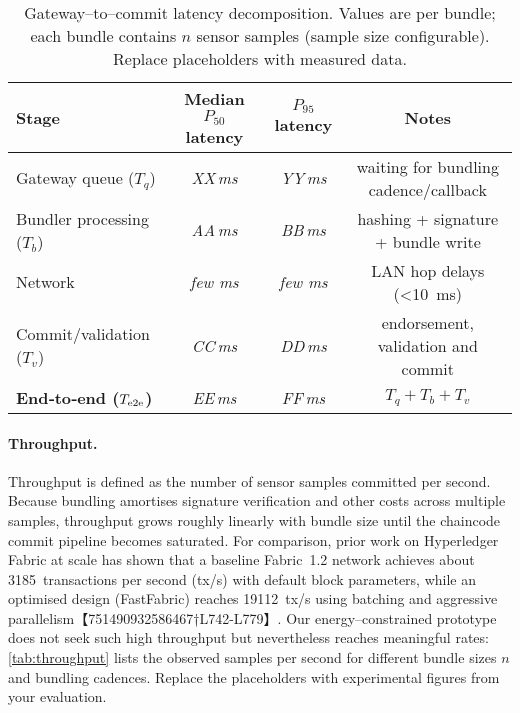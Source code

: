 \documentclass[12pt,onecolumn]{IEEEtran} %
\begin{document}
\begin{table}[h]
  \centering
  \caption{Gateway–to–commit latency decomposition.  Values are per bundle; each
  bundle contains $n$ sensor samples (sample size configurable).  Replace
  placeholders with measured data.}
  \label{tab:latency-metrics}
  \begin{tabular}{lccc}
    \toprule
    Stage & Median $P_{50}$ latency & $P_{95}$ latency & Notes \\
    \midrule
    Gateway queue ($T_q$) & \textit{XX\,ms} & \textit{YY\,ms} & waiting for
    bundling cadence/callback \\
    Bundler processing ($T_b$) & \textit{AA\,ms} & \textit{BB\,ms} &
    hashing + signature + bundle write \\
    Network & \textit{few ms} & \textit{few ms} & LAN hop delays
    (\textless{}10~ms) \\
    Commit/validation ($T_v$) & \textit{CC\,ms} & \textit{DD\,ms} &
    endorsement, validation and commit \\
    \midrule
    \textbf{End‑to‑end ($T_{\rm e2e}$)} & \textit{EE\,ms} & \textit{FF\,ms}
    & $T_q + T_b + T_v$ \\
    \bottomrule
  \end{tabular}
\end{table}

\paragraph{Throughput.}  Throughput is defined as the number of sensor samples
committed per second.  Because bundling amortises signature verification and
other costs across multiple samples, throughput grows roughly linearly with
bundle size until the chaincode commit pipeline becomes saturated.  For
comparison, prior work on Hyperledger Fabric at scale has shown that a
baseline Fabric~1.2 network achieves about \num{3185}~transactions per
second (tx/s) with default block parameters, while an optimised design (FastFabric)
reaches \num{19112}~tx/s using batching and aggressive parallelism【751490932586467†L742-L779】.
Our energy–constrained prototype does not seek such high throughput but
nevertheless reaches meaningful rates: \autoref{tab:throughput} lists the
observed samples per second for different bundle sizes $n$ and bundling
cadences.  Replace the placeholders with experimental figures from your
evaluation.
\end{document}
